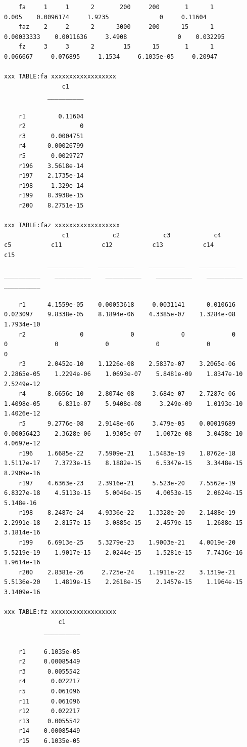 \documentclass[
]{book}
\begin{document}
\begin{verbatim}
    fa     1     1      2       200     200       1      1          0.005    0.0096174     1.9235              0     0.11604
    faz    2     2      2      3000     200      15      1     0.00033333    0.0011636     3.4908              0    0.032295
    fz     3     3      2        15      15       1      1       0.066667     0.076895     1.1534     6.1035e-05     0.20947

xxx TABLE:fa xxxxxxxxxxxxxxxxxx
                c1    
            __________

    r1         0.11604
    r2               0
    r3       0.0004751
    r4      0.00026799
    r5       0.0029727
    r196    3.5618e-14
    r197    2.1735e-14
    r198     1.329e-14
    r199    8.3938e-15
    r200    8.2751e-15

xxx TABLE:faz xxxxxxxxxxxxxxxxxx
                c1            c2            c3            c4            c5           c11           c12           c13           c14           c15    
            __________    __________    __________    __________    __________    __________    __________    __________    __________    __________

    r1      4.1559e-05    0.00053618     0.0031141      0.010616      0.023097    9.8338e-05    8.1894e-06    4.3385e-07    1.3284e-08    1.7934e-10
    r2               0             0             0             0             0             0             0             0             0             0
    r3      2.0452e-10    1.1226e-08    2.5837e-07    3.2065e-06    2.2865e-05    1.2294e-06    1.0693e-07    5.8481e-09    1.8347e-10    2.5249e-12
    r4      8.6656e-10    2.8074e-08     3.684e-07    2.7287e-06    1.4098e-05     6.831e-07    5.9408e-08     3.249e-09    1.0193e-10    1.4026e-12
    r5      9.2776e-08    2.9148e-06     3.479e-05    0.00019689    0.00056423    2.3628e-06    1.9305e-07    1.0072e-08    3.0458e-10    4.0697e-12
    r196    1.6685e-22    7.5909e-21    1.5483e-19    1.8762e-18    1.5117e-17    7.3723e-15    8.1882e-15    6.5347e-15    3.3448e-15    8.2909e-16
    r197    4.6363e-23    2.3916e-21     5.523e-20    7.5562e-19    6.8327e-18    4.5113e-15    5.0046e-15    4.0053e-15    2.0624e-15     5.148e-16
    r198    8.2487e-24    4.9336e-22    1.3328e-20    2.1488e-19    2.2991e-18    2.8157e-15    3.0885e-15    2.4579e-15    1.2688e-15    3.1814e-16
    r199    6.6913e-25    5.3279e-23    1.9003e-21    4.0019e-20    5.5219e-19    1.9017e-15    2.0244e-15    1.5281e-15    7.7436e-16    1.9614e-16
    r200    2.8381e-26     2.725e-24    1.1911e-22    3.1319e-21    5.5136e-20    1.4819e-15    2.2618e-15    2.1457e-15    1.1964e-15    3.1409e-16

xxx TABLE:fz xxxxxxxxxxxxxxxxxx
               c1    
           __________

    r1     6.1035e-05
    r2     0.00085449
    r3      0.0055542
    r4       0.022217
    r5       0.061096
    r11      0.061096
    r12      0.022217
    r13     0.0055542
    r14    0.00085449
    r15    6.1035e-05
\end{verbatim}
\end{document}
